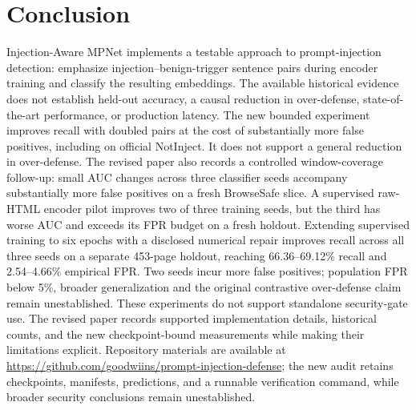 \documentclass[11pt, a4paper]{article}
\begin{document}
\section{Conclusion}
Injection-Aware MPNet implements a testable approach to prompt-injection
detection: emphasize injection--benign-trigger sentence pairs during
encoder training and classify the resulting embeddings. The available
historical evidence does not establish held-out accuracy, a causal reduction
in over-defense, state-of-the-art performance, or production latency.
The new bounded experiment improves recall with doubled pairs at the cost
of substantially more false positives, including on official NotInject.
It does not support a general reduction in over-defense. The revised paper
also records a controlled window-coverage follow-up: small AUC changes across
three classifier seeds accompany substantially more false positives on a
fresh BrowseSafe slice. A supervised raw-HTML encoder pilot improves two
of three training seeds, but the third has worse AUC and exceeds its FPR
budget on a fresh holdout. Extending supervised training to six epochs
with a disclosed numerical repair improves recall across all three seeds
on a separate 453-page holdout, reaching 66.36--69.12\% recall and
2.54--4.66\% empirical FPR. Two seeds incur more false positives;
population FPR below 5\%, broader generalization and the original
contrastive over-defense claim remain unestablished. These experiments
do not support standalone security-gate use. The revised paper
records supported implementation details, historical counts, and the new
checkpoint-bound measurements while making their limitations explicit. Repository materials are available at
\url{https://github.com/goodwiins/prompt-injection-defense}; the new audit
retains checkpoints, manifests, predictions, and a runnable verification
command, while broader security conclusions remain unestablished.



\end{document}
